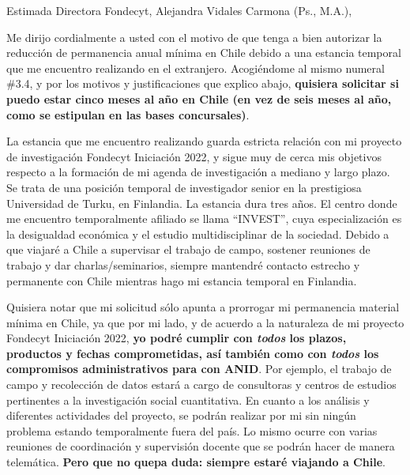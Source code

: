 \documentclass[9pt,stdletter,dateno,sigleft,openany]{newlfm} %
\begin{document}
\begin{newlfm}




\vspace{-2cm}
Estimada Directora Fondecyt, Alejandra Vidales Carmona (Ps., M.A.),

Me dirijo cordialmente a usted con el motivo de que tenga a bien autorizar la reducci\'on de permanencia anual m\'inima en Chile debido a una estancia temporal que me encuentro realizando en el extranjero. Acogi\'endome al mismo numeral \#3.4, y por los motivos y justificaciones que explico abajo, {\bf quisiera solicitar si puedo estar cinco meses al a\~no en Chile (en vez de seis meses al a\~no, como se estipulan en las bases concursales)}.

La estancia que me encuentro realizando guarda estricta relaci\'on con mi proyecto de investigaci\'on Fondecyt Iniciaci\'on 2022, y sigue muy de cerca mis objetivos respecto a la formaci\'on de mi agenda de investigaci\'on a mediano y largo plazo. Se trata de una posici\'on temporal de investigador senior en la prestigiosa Universidad de Turku, en Finlandia. La estancia dura tres a\~nos. El centro donde me encuentro temporalmente afiliado se llama ``INVEST'', cuya especializaci\'on es la desigualdad econ\'omica y el estudio multidisciplinar de la sociedad. Debido a que viajar\'e a Chile a supervisar el trabajo de campo, sostener reuniones de trabajo y dar charlas/seminarios, siempre mantendr\'e contacto estrecho y permanente con Chile mientras hago mi estancia temporal en Finlandia. 

Quisiera notar que mi solicitud s\'olo apunta a prorrogar mi permanencia material m\'inima en Chile, ya que por mi lado, y de acuerdo a la naturaleza de mi proyecto Fondecyt Iniciaci\'on 2022, {\bf yo podr\'e cumplir con \emph{todos} los plazos, productos y fechas comprometidas, as\'i tambi\'en como con \emph{todos} los compromisos administrativos para con ANID}. Por ejemplo, el trabajo de campo y recolecci\'on de datos estar\'a a cargo de consultoras y centros de estudios pertinentes a la investigaci\'on social cuantitativa. En cuanto a los an\'alisis y diferentes actividades del proyecto, se podr\'an realizar por mi sin ning\'un problema estando temporalmente fuera del pa\'is. Lo mismo ocurre con varias reuniones de coordinaci\'on y supervisi\'on docente que se podr\'an hacer de manera telem\'atica. {\bf Pero que no quepa duda: siempre estar\'e viajando a Chile}.


\end{newlfm}
\end{document}
